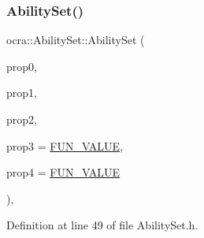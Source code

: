 \subsubsection{\texorpdfstring{Ability\+Set()}{AbilitySet()}\hspace{0.1cm}{\footnotesize\ttfamily [3/4]}}
{\footnotesize\ttfamily ocra\+::\+Ability\+Set\+::\+Ability\+Set (\begin{DoxyParamCaption}\item[{\hyperlink{namespaceocra_a40ddbec106a6034cd2047bba9945b568}{e\+Function\+Ability}}]{prop0,  }\item[{\hyperlink{namespaceocra_a40ddbec106a6034cd2047bba9945b568}{e\+Function\+Ability}}]{prop1,  }\item[{\hyperlink{namespaceocra_a40ddbec106a6034cd2047bba9945b568}{e\+Function\+Ability}}]{prop2,  }\item[{\hyperlink{namespaceocra_a40ddbec106a6034cd2047bba9945b568}{e\+Function\+Ability}}]{prop3 = {\ttfamily \hyperlink{namespaceocra_a40ddbec106a6034cd2047bba9945b568acfb47b20329993093d2022b017239bd8}{F\+U\+N\+\_\+\+V\+A\+L\+UE}},  }\item[{\hyperlink{namespaceocra_a40ddbec106a6034cd2047bba9945b568}{e\+Function\+Ability}}]{prop4 = {\ttfamily \hyperlink{namespaceocra_a40ddbec106a6034cd2047bba9945b568acfb47b20329993093d2022b017239bd8}{F\+U\+N\+\_\+\+V\+A\+L\+UE}} }\end{DoxyParamCaption})\hspace{0.3cm}{\ttfamily [inline]}, {\ttfamily [protected]}}



Definition at line 49 of file Ability\+Set.\+h.

\hypertarget{classocra_1_1AbilitySet_a1383bb4705a010d46ccab36107a20985}{}\label{classocra_1_1AbilitySet_a1383bb4705a010d46ccab36107a20985} 
